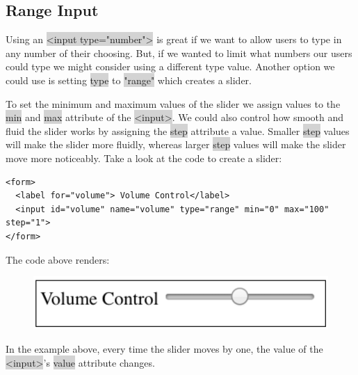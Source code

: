 \documentclass[11pt]{article}
\begin{document}
\subsection{Range Input}
Using an \colorbox{lightgray}{<input type="number">} is great if we want to allow users to type in any number of their choosing. But, if we wanted to limit what numbers our users could type we might consider using a different type value. Another option we could use is setting \colorbox{lightgray}{type} to \colorbox{lightgray}{"range"} which creates a slider.

To set the minimum and maximum values of the slider we assign values to the \colorbox{lightgray}{min} and \colorbox{lightgray}{max} attribute of the \colorbox{lightgray}{<input>}. We could also control how smooth and fluid the slider works by assigning the \colorbox{lightgray}{step} attribute a value. Smaller \colorbox{lightgray}{step} values will make the slider more fluidly, whereas larger \colorbox{lightgray}{step} values will make the slider move more noticeably. Take a look at the code to create a slider:
\begin{lstlisting}
<form>
  <label for="volume"> Volume Control</label>
  <input id="volume" name="volume" type="range" min="0" max="100" step="1">
</form>
\end{lstlisting}
The code above renders: 
\begin{figure}[H]
\includegraphics[scale = 0.5]{3_8}
\centering
\end{figure}
\vspace{-4mm}
In the example above, every time the slider moves by one, the value of the \colorbox{lightgray}{<input>}'s \colorbox{lightgray}{value} attribute changes.
\end{document}

